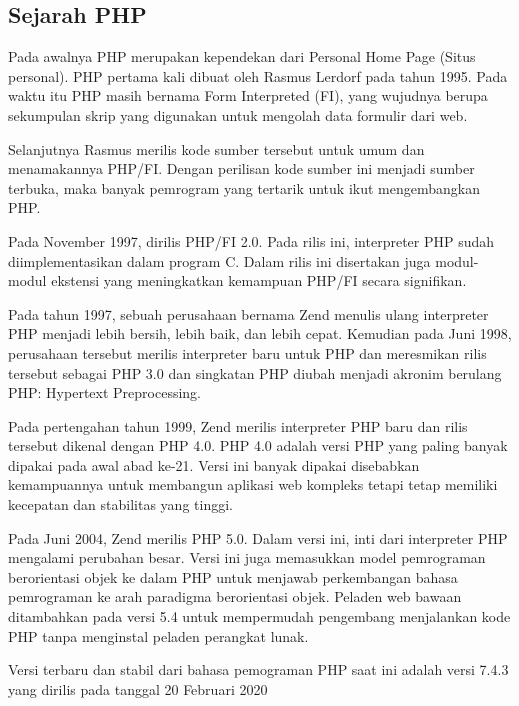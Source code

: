 \subsection{Sejarah PHP}
Pada awalnya PHP merupakan kependekan dari Personal Home Page (Situs personal). PHP pertama kali dibuat oleh Rasmus Lerdorf pada tahun 1995. Pada waktu itu PHP masih bernama Form Interpreted (FI), yang wujudnya berupa sekumpulan skrip yang digunakan untuk mengolah data formulir dari web.

Selanjutnya Rasmus merilis kode sumber tersebut untuk umum dan menamakannya PHP/FI. Dengan perilisan kode sumber ini menjadi sumber terbuka, maka banyak pemrogram yang tertarik untuk ikut mengembangkan PHP.

Pada November 1997, dirilis PHP/FI 2.0. Pada rilis ini, interpreter PHP sudah diimplementasikan dalam program C. Dalam rilis ini disertakan juga modul-modul ekstensi yang meningkatkan kemampuan PHP/FI secara signifikan.

Pada tahun 1997, sebuah perusahaan bernama Zend menulis ulang interpreter PHP menjadi lebih bersih, lebih baik, dan lebih cepat. Kemudian pada Juni 1998, perusahaan tersebut merilis interpreter baru untuk PHP dan meresmikan rilis tersebut sebagai PHP 3.0 dan singkatan PHP diubah menjadi akronim berulang PHP: Hypertext Preprocessing.

Pada pertengahan tahun 1999, Zend merilis interpreter PHP baru dan rilis tersebut dikenal dengan PHP 4.0. PHP 4.0 adalah versi PHP yang paling banyak dipakai pada awal abad ke-21. Versi ini banyak dipakai disebabkan kemampuannya untuk membangun aplikasi web kompleks tetapi tetap memiliki kecepatan dan stabilitas yang tinggi.

Pada Juni 2004, Zend merilis PHP 5.0. Dalam versi ini, inti dari interpreter PHP mengalami perubahan besar. Versi ini juga memasukkan model pemrograman berorientasi objek ke dalam PHP untuk menjawab perkembangan bahasa pemrograman ke arah paradigma berorientasi objek. Peladen web bawaan ditambahkan pada versi 5.4 untuk mempermudah pengembang menjalankan kode PHP tanpa menginstal peladen perangkat lunak.

Versi terbaru dan stabil dari bahasa pemograman PHP saat ini adalah versi 7.4.3 yang dirilis pada tanggal 20 Februari 2020

